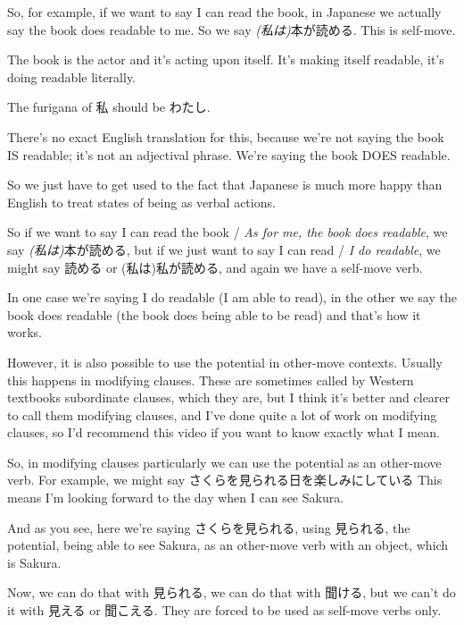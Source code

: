 So, for example, if we want to say I can read the book, in Japanese we actually say the book does readable to me. So we say {\em (私は)}本が読める. This is self-move.

The book is the actor and it's acting upon itself. It's making itself readable, it's doing readable literally.

{}

The furigana of 私 should be わたし.

There's no exact English translation for this, because we're not saying the book IS readable; it's not an adjectival phrase. We're saying the book DOES readable.

So we just have to get used to the fact that Japanese is much more happy than English to treat states of being as verbal actions.

So if we want to say I can read the book / {\em As for me, the book does readable}, we say {\em (私は)}本が読める, but if we just want to say I can read / {\em I do readable}, we might say 読める or (私は)私が読める, and again we have a self-move verb.

{}

In one case we're saying I do readable (I am able to read), in the other we say the book does readable (the book does being able to be read) and that's how it works.

However, it is also possible to use the potential in other-move contexts. Usually this happens in modifying clauses. These are sometimes called by Western textbooks subordinate clauses, which they are, but I think it's better and clearer to call them modifying clauses, and I've done quite a lot of work on modifying clauses, so I'd recommend this video if you want to know exactly what I mean.

So, in modifying clauses particularly we can use the potential as an other-move verb. For example, we might say さくらを見られる日を楽しみにしている This means I'm looking forward to the day when I can see Sakura.

{}

And as you see, here we're saying さくらを見られる, using 見られる, the potential, being able to see Sakura, as an other-move verb with an object, which is Sakura.

Now, we can do that with 見られる, we can do that with 聞ける, but we can't do it with 見える or 聞こえる. They are forced to be used as self-move verbs only.

